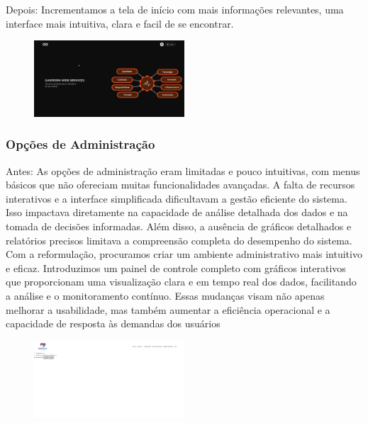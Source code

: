 \documentclass[conference, a4paper, 12pt]{IEEEtran}
\begin{document}
Depois: Incrementamos a tela de início com mais informações relevantes, uma interface mais intuitiva, clara e facil de se encontrar.
\begin{figure}[h]
  \begin{center}
    \includegraphics[width=0.5\textwidth]{home_principal.png}
  \end{center}
\end{figure}
\subsubsection{Opções de Administração}

Antes: As opções de administração eram limitadas e pouco intuitivas, com menus básicos que não ofereciam muitas funcionalidades avançadas. A falta de recursos interativos e a interface simplificada dificultavam a gestão eficiente do sistema. Isso impactava diretamente na capacidade de análise detalhada dos dados e na tomada de decisões informadas. Além disso, a ausência de gráficos detalhados e relatórios precisos limitava a compreensão completa do desempenho do sistema. Com a reformulação, procuramos criar um ambiente administrativo mais intuitivo e eficaz. Introduzimos um painel de controle completo com gráficos interativos que proporcionam uma visualização clara e em tempo real dos dados, facilitando a análise e o monitoramento contínuo. Essas mudanças visam não apenas melhorar a usabilidade, mas também aumentar a eficiência operacional e a capacidade de resposta às demandas dos usuários
\begin{figure}[h]
  \begin{center}
    \includegraphics[width=0.5\textwidth]{tempo_real_antiga.png}
  \end{center}
\end{figure}
\end{document}
